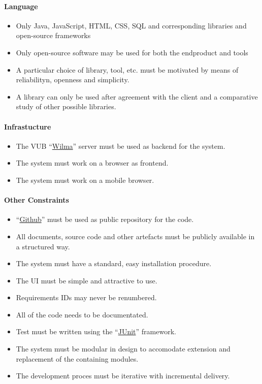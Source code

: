 \documentclass[9pt]{article}
\begin{document}
\paragraph{Language}\label{language}

\begin{itemize}
\itemsep1pt\parskip0pt
\item
  Only Java, JavaScript, HTML, CSS, SQL and corresponding libraries and
  open-source frameworks
\item
  Only open-source software may be used for both the endproduct and
  tools
\item
  A particular choice of library, tool, etc. must be motivated by means
  of reliabilityn, openness and simplicity.
\item
  A library can only be used after agreement with the client and a
  comparative study of other possible libraries.
\end{itemize}

\paragraph{Infrastucture}\label{infrastucture}

\begin{itemize}
\itemsep1pt\parskip0pt
\item
  The VUB ``\hyperref[Wilma]{Wilma}'' server must be used as backend for
  the system.
\item
  The system must work on a browser as frontend.
\item
  The system must work on a mobile browser.
\end{itemize}

\paragraph{Other Constraints}\label{other-constraints}

\begin{itemize}
\itemsep1pt\parskip0pt
\item
  ``\hyperref[Github]{Github}'' must be used as public repository for
  the code.
\item
  All documents, source code and other artefacts must be publicly
  available in a structured way.
\item
  The system must have a standard, easy installation procedure.
\item
  The UI must be simple and attractive to use.
\item
  Requirements IDs may never be renumbered.
\item
  All of the code needs to be documentated.
\item
  Test must be written using the ``\hyperref[JUnit]{JUnit}'' framework.
\item
  The system must be modular in design to accomodate extension and
  replacement of the containing modules.
\item
  The development proces must be iterative with incremental delivery.
\end{itemize}
\end{document}
